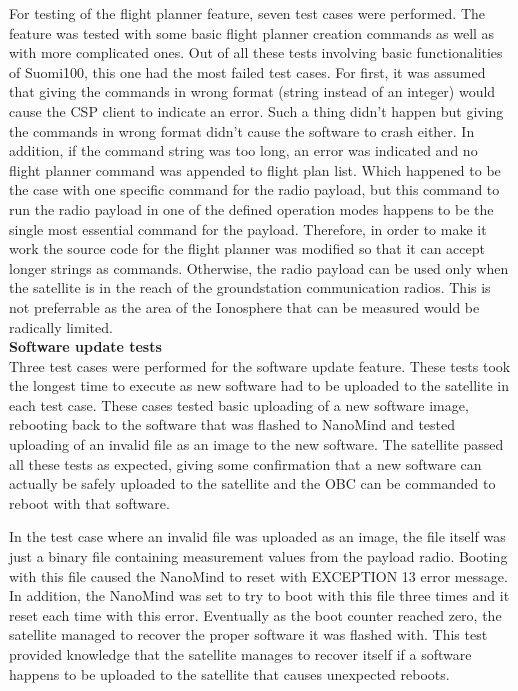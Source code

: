 \documentclass[english,12pt,a4paper,pdftex,elec,utf8]{aaltothesis}
\begin{document}
For testing of the flight planner feature, seven test cases were performed. The feature was tested with some basic flight planner creation commands as well as with more complicated ones. Out of all these tests involving basic functionalities of Suomi100, this one had the most failed test cases. For first, it was assumed that giving the commands in wrong format (string instead of an integer) would cause the CSP client to indicate an error. Such a thing didn't happen but giving the commands in wrong format didn't cause the software to crash either. In addition, if the command string was too long, an error was indicated and no flight planner command was appended to flight plan list. Which happened to be the case with one specific command for the radio payload, but this command to run the radio payload in one of the defined operation modes happens to be the single most essential command for the payload. Therefore, in order to make it work the source code for the flight planner was modified so that it can accept longer strings as commands. Otherwise, the radio payload can be used only when the satellite is in the reach of the groundstation communication radios. This is not preferrable as the area of the Ionosphere that can be measured would be radically limited.\\
\textbf{Software update tests}
\\ 
Three test cases were performed for the software update feature. These tests took the longest time to execute as new software had to be uploaded to the satellite in each test case. These cases tested basic uploading of a new software image, rebooting back to the software that was flashed to NanoMind and tested uploading of an invalid file as an image to the new software. The satellite passed all these tests as expected, giving some confirmation that a new software can actually be safely uploaded to the satellite and the OBC can be commanded to reboot with that software. \par
In the test case where an invalid file was uploaded as an image, the file itself was just a binary file containing measurement values from the payload radio. Booting with this file caused the NanoMind to reset with EXCEPTION 13 error message. In addition, the NanoMind was set to try to boot with this file three times and it reset each time with this error. Eventually as the boot counter reached zero, the satellite managed to recover the proper software it was flashed with. This test provided knowledge that the satellite manages to recover itself if a software happens to be uploaded to the satellite that causes unexpected reboots.\par
\end{document}
